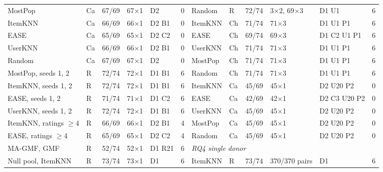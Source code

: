 \begin{table}[H]
\begin{tabular}{llrlll@{\hspace{8pt}}llrlll}
MostPop & Ca & 67/69 & 67$\times$1 & D2 & 0 & Random & R & 72/74 & 3$\times$2, 69$\times$3 & D1 U1 & 6 \\
ItemKNN & Ca & 66/69 & 66$\times$1 & D2 B1 & 0 & ItemKNN & Ch & 71/74 & 71$\times$3 & D1 U1 P1 & 6 \\
EASE & Ca & 65/69 & 65$\times$1 & D2 C2 & 0 & EASE & Ch & 69/74 & 69$\times$3 & D1 C2 U1 P1 & 6 \\
UserKNN & Ca & 66/69 & 66$\times$1 & D2 B1 & 0 & UserKNN & Ch & 71/74 & 71$\times$3 & D1 U1 P1 & 6 \\
Random & Ca & 67/69 & 67$\times$1 & D2 & 0 & MostPop & Ch & 71/74 & 71$\times$3 & D1 U1 P1 & 6 \\
MostPop, seeds 1, 2 & R & 72/74 & 72$\times$1 & D1 B1 & 6 & Random & Ch & 71/74 & 71$\times$3 & D1 U1 P1 & 6 \\
ItemKNN, seeds 1, 2 & R & 72/74 & 72$\times$1 & D1 B1 & 6 & ItemKNN & Ca & 45/69 & 45$\times$1 & D2 U20 P2 & 0 \\
EASE, seeds 1, 2 & R & 71/74 & 71$\times$1 & D1 C2 & 6 & EASE & Ca & 42/69 & 42$\times$1 & D2 C3 U20 P2 & 0 \\
UserKNN, seeds 1, 2 & R & 72/74 & 72$\times$1 & D1 B1 & 6 & UserKNN & Ca & 45/69 & 45$\times$1 & D2 U20 P2 & 0 \\
ItemKNN, ratings $\geq$4 & R & 66/69 & 66$\times$1 & D2 B1 & 4 & MostPop & Ca & 45/69 & 45$\times$1 & D2 U20 P2 & 0 \\
EASE, ratings $\geq$4 & R & 65/69 & 65$\times$1 & D2 C2 & 4 & Random & Ca & 45/69 & 45$\times$1 & D2 U20 P2 & 0 \\
MA-GMF, GMF & R & 52/74 & 52$\times$1 & D1 R21 & 6 & \multicolumn{6}{l}{\emph{RQ4 single donor}} \\
Null pool, ItemKNN & R & 73/74 & 73$\times$1 & D1 & 6 & ItemKNN & R & 73/74 & 370/370 pairs & D1 & 6 \\
\bottomrule
\end{tabular}

\end{table}

